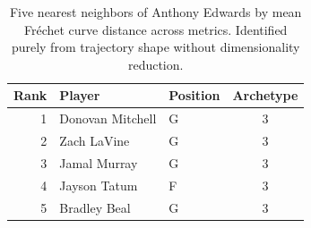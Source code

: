 \begin{table}[htbp]
  \centering\small
  \begin{tabular}{rllc}
    \toprule
    Rank & Player & Position & Archetype \\
    \midrule
    1 & Donovan Mitchell & G & 3 \\
    2 & Zach LaVine & G & 3 \\
    3 & Jamal Murray & G & 3 \\
    4 & Jayson Tatum & F & 3 \\
    5 & Bradley Beal & G & 3 \\
    \bottomrule
  \end{tabular}
  \caption{Five nearest neighbors of Anthony Edwards by mean Fr\'{e}chet curve distance across metrics. Identified purely from trajectory shape without dimensionality reduction.}
  \label{tab:Anthony_Edwards_frechet_curve_neighbors}
\end{table}

